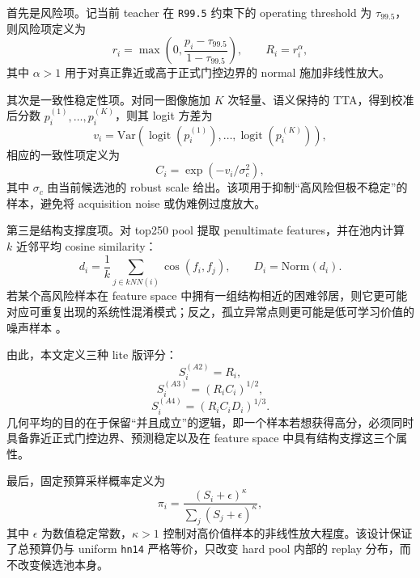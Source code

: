\documentclass[UTF8,openany,12pt]{ctexbook}
\newcommand{\formalmetric}[1]{\texttt{#1}}
\begin{document}
首先是风险项。记当前 teacher 在 \formalmetric{R99.5} 约束下的 operating threshold 为 $\tau_{99.5}$，则风险项定义为
\begin{equation}
r_i = \max\left(0,\frac{p_i-\tau_{99.5}}{1-\tau_{99.5}}\right),
\qquad
R_i = r_i^\alpha,
\end{equation}
其中 $\alpha > 1$ 用于对真正靠近或高于正式门控边界的 normal 施加非线性放大。

其次是一致性稳定性项。对同一图像施加 $K$ 次轻量、语义保持的 TTA，得到校准后分数 $p_i^{(1)},\dots,p_i^{(K)}$，则其 logit 方差为
\begin{equation}
v_i = \mathrm{Var}\!\left(\operatorname{logit}(p_i^{(1)}),\dots,\operatorname{logit}(p_i^{(K)})\right),
\end{equation}
相应的一致性项定义为
\begin{equation}
C_i = \exp(-v_i/\sigma_c^2),
\end{equation}
其中 $\sigma_c$ 由当前候选池的 robust scale 给出。该项用于抑制“高风险但极不稳定”的样本，避免将 acquisition noise 或伪难例过度放大。

第三是结构支撑度项。对 top250 pool 提取 penultimate features，并在池内计算 $k$ 近邻平均 cosine similarity：
\begin{equation}
d_i = \frac{1}{k}\sum_{j\in kNN(i)} \cos(f_i,f_j),
\qquad
D_i = \mathrm{Norm}(d_i).
\end{equation}
若某个高风险样本在 feature space 中拥有一组结构相近的困难邻居，则它更可能对应可重复出现的系统性混淆模式；反之，孤立异常点则更可能是低可学习价值的噪声样本 \cite{kim2024structural}。

由此，本文定义三种 lite 版评分：
\begin{equation}
S_i^{(A2)} = R_i,
\end{equation}
\begin{equation}
S_i^{(A3)} = (R_i C_i)^{1/2},
\end{equation}
\begin{equation}
S_i^{(A4)} = (R_i C_i D_i)^{1/3}.
\end{equation}
几何平均的目的在于保留“并且成立”的逻辑，即一个样本若想获得高分，必须同时具备靠近正式门控边界、预测稳定以及在 feature space 中具有结构支撑这三个属性。

最后，固定预算采样概率定义为
\begin{equation}
\pi_i = \frac{(S_i+\epsilon)^\kappa}{\sum_j (S_j+\epsilon)^\kappa},
\end{equation}
其中 $\epsilon$ 为数值稳定常数，$\kappa>1$ 控制对高价值样本的非线性放大程度。该设计保证了总预算仍与 uniform \texttt{hn14} 严格等价，只改变 hard pool 内部的 replay 分布，而不改变候选池本身。
\end{document}
